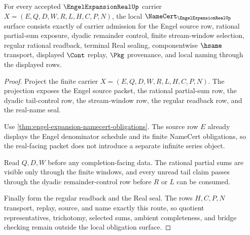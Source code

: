 \begin{theorem}
\label{thm:engel-expansion-real-namecert-obligations}
For every accepted $\EngelExpansionRealUp$ carrier $X=(E,Q,D,W,R,L,H,C,P,N)$, the local $\NameCert_{\EngelExpansionRealUp}$ surface consists exactly of carrier admission for the Engel source row, rational partial-sum exposure, dyadic remainder control, finite stream-window selection, regular rational readback, terminal Real sealing, componentwise $\hsame$ transport, displayed $\Cont$ replay, $\Pkg$ provenance, and local naming through the displayed rows.
\end{theorem}
\begin{proof}
Project the finite carrier $X=(E,Q,D,W,R,L,H,C,P,N)$. The projection exposes the Engel source packet, the rational partial-sum row, the dyadic tail-control row, the stream-window row, the regular readback row, and the real-name seal.

Use \autoref{thm:engel-expansion-namecert-obligations}. The source row $E$ already displays the Engel denominator schedule and its finite NameCert obligations, so the real-facing packet does not introduce a separate infinite series object.

Read $Q,D,W$ before any completion-facing data. The rational partial sums are visible only through the finite windows, and every unread tail claim passes through the dyadic remainder-control row before $R$ or $L$ can be consumed.

Finally form the regular readback and the Real seal. The rows $H,C,P,N$ transport, replay, source, and name exactly this route, so quotient representatives, trichotomy, selected sums, ambient completeness, and bridge checking remain outside the local obligation surface.
\end{proof}

